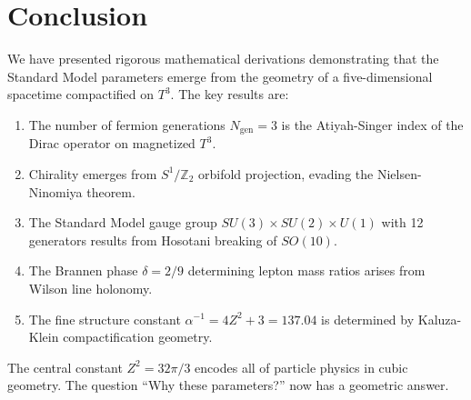 \documentclass[12pt,a4paper]{article}
\theoremstyle{definition}
\theoremstyle{remark}
\newcommand{\Ngen}{N_{\mathrm{gen}}}
\begin{document}
\section{Conclusion}
\label{sec:conclusion}

We have presented rigorous mathematical derivations demonstrating that the Standard Model parameters emerge from the geometry of a five-dimensional spacetime compactified on $T^3$. The key results are:

\begin{enumerate}
\item The number of fermion generations $\Ngen = 3$ is the Atiyah-Singer index of the Dirac operator on magnetized $T^3$.

\item Chirality emerges from $S^1/\mathbb{Z}_2$ orbifold projection, evading the Nielsen-Ninomiya theorem.

\item The Standard Model gauge group $SU(3) \times SU(2) \times U(1)$ with 12 generators results from Hosotani breaking of $SO(10)$.

\item The Brannen phase $\delta = 2/9$ determining lepton mass ratios arises from Wilson line holonomy.

\item The fine structure constant $\alpha^{-1} = 4Z^2 + 3 = 137.04$ is determined by Kaluza-Klein compactification geometry.
\end{enumerate}

The central constant $Z^2 = 32\pi/3$ encodes all of particle physics in cubic geometry. The question ``Why these parameters?'' now has a geometric answer.

\end{document}
